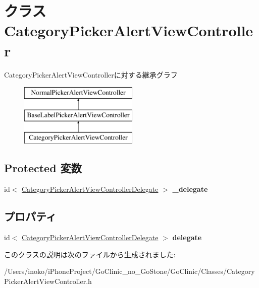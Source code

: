\hypertarget{interface_category_picker_alert_view_controller}{
\section{クラス CategoryPickerAlertViewController}
\label{interface_category_picker_alert_view_controller}
}
CategoryPickerAlertViewControllerに対する継承グラフ\begin{figure}[H]
\begin{center}
\leavevmode
\includegraphics[height=3.000000cm]{interface_category_picker_alert_view_controller}
\end{center}
\end{figure}
\subsection*{Protected 変数}
\begin{DoxyCompactItemize}
\item 
\hypertarget{interface_category_picker_alert_view_controller_a2418d137f86b80e2899746eea82270f1}{
id$<$ \hyperlink{protocol_category_picker_alert_view_controller_delegate-p}{CategoryPickerAlertViewControllerDelegate} $>$ {\bfseries \_\-delegate}}
\label{interface_category_picker_alert_view_controller_a2418d137f86b80e2899746eea82270f1}

\end{DoxyCompactItemize}
\subsection*{プロパティ}
\begin{DoxyCompactItemize}
\item 
\hypertarget{interface_category_picker_alert_view_controller_a0f6af2c837b2e1d350717f030274f5c7}{
id$<$ \hyperlink{protocol_category_picker_alert_view_controller_delegate-p}{CategoryPickerAlertViewControllerDelegate} $>$ {\bfseries delegate}}
\label{interface_category_picker_alert_view_controller_a0f6af2c837b2e1d350717f030274f5c7}

\end{DoxyCompactItemize}


このクラスの説明は次のファイルから生成されました:\begin{DoxyCompactItemize}
\item 
/Users/inoko/iPhoneProject/GoClinic\_\-no\_\-GoStone/GoClinic/Classes/CategoryPickerAlertViewController.h\end{DoxyCompactItemize}
